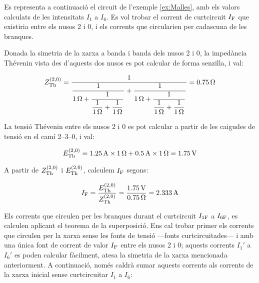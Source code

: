 \begin{exemple}\label{ex:CurtcircuitXarxaSenzilla}
	\addcontentsxms{\CurtcircuitXarxaSenzilla}	
	Es representa a continuació el circuit de l'exemple \vref{ex:Malles}, amb els valors calculats de les intensitats $I_1$ a $I_6$. Es vol trobar el corrent de curtcircuit $I_\mathrm{F}$ que existiria entre els nusos 2 i 0, i els corrents que circularien per cadascuna de les branques.
	
	\begin{center}
		
	\end{center}
	
	Donada la simetria de la xarxa  a banda i banda dels nusos 2 i 0, la impedància Thévenin vista des d'aquests dos nusos es pot calcular de forma senzilla, i val:

	\[
	Z_\mathrm{Th}^{(2,0)} = \dfrac{1}{\dfrac{1}{\qty{1}{\ohm}+\dfrac{1}{\dfrac{1}{\qty{1}{\ohm}}+\dfrac{1}{\qty{1}{\ohm}}}}+\dfrac{1}{\qty{1}{\ohm}+\dfrac{1}{\dfrac{1}{\qty{1}{\ohm}}+\dfrac{1}{\qty{1}{\ohm}}}}} = \qty{0,75}{\ohm}
	\]
	
	La tensió Thévenin entre els nusos 2 i 0 es pot calcular a partir de les caigudes de tensió en el camí 2--3--0, i val:

	\[
	E_\mathrm{Th}^{(2,0)} = \qty{1,25}{A} \times \qty{1}{\ohm} + \qty{0,5}{A} \times \qty{1}{\ohm} = \qty{1,75}{V}
	\]
	
	
	A partir de $Z_\mathrm{Th}^{(2,0)}$ i $E_\mathrm{Th}^{(2,0)}$, calculem $I_\mathrm{F}$ segons:

	\[
	I_\mathrm{F} = \frac{E_\mathrm{Th}^{(2,0)}}{Z_\mathrm{Th}^{(2,0)}} = \frac{\qty{1,75}{V}}{\qty{0,75}{\ohm}} = \qty{2,333}{A}
	\]
	
	Els corrents que circulen per les branques durant el curtcircuit  $I_\mathrm{1F}$ a $I_\mathrm{6F}$, es calculen aplicant el teorema de la superposició. Ens cal trobar primer els corrents que circulen per la xarxa sense les fonts de tensió ---fonts curtcircuitades--- i amb una única font de corrent de valor  $I_\mathrm{F}$ entre els nusos 2 i 0; aquests corrents $I_1'$ a $I_6'$ es poden calcular fàcilment, atesa la simetria de la xarxa mencionada anteriorment. A continuació, només caldrà sumar aquests corrents als corrents de la xarxa inicial sense curtcircuitar $I_1$ a $I_6$:


\end{exemple}
